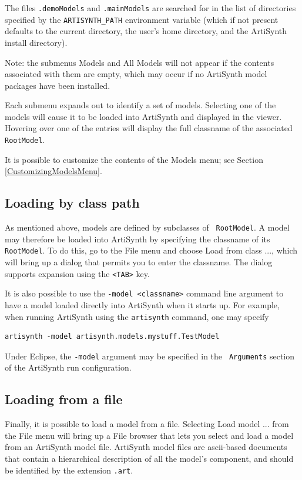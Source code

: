 \documentclass{article}
\begin{document}
The files {\tt .demoModels} and {\tt .mainModels} are searched for in
the list of directories specified by the {\tt ARTISYNTH\_PATH}
environment variable (which if not present defaults to the current
directory, the user's home directory, and the ArtiSynth install
directory).

\begin{sideblock}
Note: the submenus {\sf Models} and {\sf All Models} will not appear
if the contents associated with them are empty, which may occur if no
ArtiSynth model packages have been installed.
\end{sideblock}

Each submenu expands out to identify a set of models. Selecting
one of the models will cause it to be loaded into ArtiSynth and
displayed in the viewer. Hovering over one of the entries will
display the full classname of the associated {\tt RootModel}.

It is possible to customize the contents of the {\sf Models} menu; see
Section \ref{CustomizingModelsMenu}.

\subsection{Loading by class path}

As mentioned above, models are defined by subclasses of {\tt
RootModel}.  A model may therefore be loaded into
ArtiSynth by specifying the classname of its {\tt RootModel}.  To do
this, go to the {\sf File} menu and choose {\sf Load from class ...},
which will bring up a dialog that permits you to enter the
classname. The dialog supports expansion using the {\tt <TAB>} key.

It is also possible to use the {\tt -model <classname>} command line
argument to have a model loaded directly into ArtiSynth when it starts
up. For example, when running ArtiSynth using the {\tt artisynth}
command, one may specify
\begin{lstlisting}[]
  artisynth -model artisynth.models.mystuff.TestModel
\end{lstlisting}
Under Eclipse, the {\tt -model} argument may be specified in the {\tt
Arguments} section of the ArtiSynth run configuration.

\subsection{Loading from a file}

Finally, it is possible to load a model from a file.  Selecting {\sf
Load model ...} from the {\sf File} menu will bring up a File browser
that lets you select and load a model from an ArtiSynth model file.
ArtiSynth model files are ascii-based documents that contain a
hierarchical description of all the model's component, and should be
identified by the extension {\tt .art}.
\end{document}
